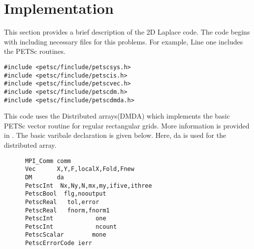 \chapter{Implementation}
\hspace{0.25cm}This section provides a brief description of the 2D Laplace code. The code begins with including necessary files for this problems. For example, Line one includes the PETSc routines.  

\begin{lstlisting}
#include <petsc/finclude/petscsys.h>
#include <petsc/finclude/petscis.h>
#include <petsc/finclude/petscvec.h>
#include <petsc/finclude/petscdm.h>
#include <petsc/finclude/petscdmda.h>
\end{lstlisting}

This code uses the Distributed arrays(DMDA) which implements the basic PETSc vector routine for regular rectangular grids. More information is provided in \cite{petsc}. The basic varibale declaration is given below. Here, da is used for the distributed array.

\begin{lstlisting}
      MPI_Comm comm
      Vec      X,Y,F,localX,Fold,Fnew
      DM       da
      PetscInt  Nx,Ny,N,mx,my,ifive,ithree
      PetscBool  flg,nooutput
      PetscReal   tol,error
      PetscReal   fnorm,fnorm1
      PetscInt            one
      PetscInt            ncount
      PetscScalar        mone
      PetscErrorCode ierr
\end{lstlisting}

